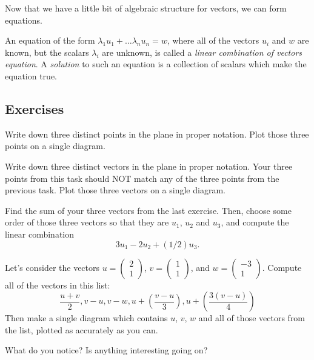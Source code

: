 \documentclass[elementsmain.tex]{subfiles}
\begin{document}
Now that we have a little bit of algebraic structure for vectors, we can form equations.

\begin{definition}
An equation of the form $\lambda_1 u_1 + \dots \lambda_n u_n = w$, where all of the vectors $u_i$ and $w$ are known, but the scalars $\lambda_i$ are unknown, is called a \emph{linear combination of vectors equation}.
A \emph{solution} to such an equation is 
a collection of scalars which make the equation true.
\end{definition}




\clearpage

\subsection*{Exercises}

\begin{exercise}
Write down three distinct points in the plane in proper notation. 
Plot those three points on a single diagram.
\end{exercise}

\begin{exercise}
Write down three distinct vectors in the plane in proper notation. 
Your three points from this task should NOT match any of the three points from the previous task.
Plot those three vectors on a single diagram.
\end{exercise}



\begin{exercise}
Find the sum of your three vectors from the last exercise. Then, choose some order of those three vectors so that they are $u_1$, $u_2$ and $u_3$, and compute the linear combination
\[
3u_1 - 2u_2 + (1/2)u_3.
\] 
\end{exercise}

\begin{exercise}
Let's consider the vectors $u=\left(\begin{smallmatrix} 2 \\1 \end{smallmatrix}\right)$, 
$v=\left(\begin{smallmatrix} 1\\ 1 \end{smallmatrix}\right)$, and $w=\left(\begin{smallmatrix} -3\\ 1 \end{smallmatrix}\right)$.
Compute all of the vectors in this list:
\[
\dfrac{u+v}{2}, v-u, v-w, u + \left(\dfrac{v-u}{3}\right), u + \left(\dfrac{3(v-u)}{4}\right)
\]
Then make a single diagram which contains $u$, $v$, $w$ and all of those vectors from the list, plotted as accurately as you can.

What do you notice? Is anything interesting going on?
\end{exercise}
\end{document}
